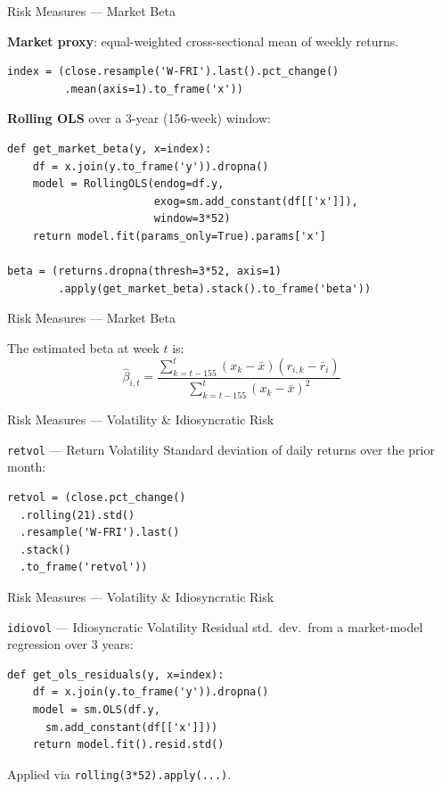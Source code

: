 \documentclass[aspectratio=169]{beamer}
\begin{document}
%
%
\begin{frame}[fragile]{Risk Measures --- Market Beta}

\textbf{Market proxy}: equal-weighted cross-sectional mean of weekly returns.

\begin{lstlisting}
index = (close.resample('W-FRI').last().pct_change()
         .mean(axis=1).to_frame('x'))
\end{lstlisting}

\vspace{0.15cm}

\textbf{Rolling OLS} over a 3-year (156-week) window:

\begin{lstlisting}
def get_market_beta(y, x=index):
    df = x.join(y.to_frame('y')).dropna()
    model = RollingOLS(endog=df.y,
                       exog=sm.add_constant(df[['x']]),
                       window=3*52)
    return model.fit(params_only=True).params['x']

beta = (returns.dropna(thresh=3*52, axis=1)
        .apply(get_market_beta).stack().to_frame('beta'))
\end{lstlisting}
\end{frame}
%
%
\begin{frame}[fragile]{Risk Measures --- Market Beta}

The estimated beta at week $t$ is:
$$
\hat\beta_{i,t} = \frac{\sum_{k=t-155}^{t}(x_k - \bar x)(r_{i,k} - \bar r_i)}{\sum_{k=t-155}^{t}(x_k - \bar x)^2}
$$

\end{frame}
%
%
\begin{frame}[fragile]{Risk Measures --- Volatility \& Idiosyncratic Risk}

\begin{block}{\texttt{retvol} --- Return Volatility}
Standard deviation of daily returns over the prior month:
\begin{lstlisting}
retvol = (close.pct_change()
  .rolling(21).std()
  .resample('W-FRI').last()
  .stack()
  .to_frame('retvol'))
\end{lstlisting}
\end{block}
\end{frame}
%
%
\begin{frame}[fragile]{Risk Measures --- Volatility \& Idiosyncratic Risk}
\begin{block}{\texttt{idiovol} --- Idiosyncratic Volatility}
Residual std.\ dev.\ from a market-model regression over 3 years:
\begin{lstlisting}
def get_ols_residuals(y, x=index):
    df = x.join(y.to_frame('y')).dropna()
    model = sm.OLS(df.y,
      sm.add_constant(df[['x']]))
    return model.fit().resid.std()
\end{lstlisting}
Applied via \texttt{rolling(3*52).apply(...)}.
\end{block}
\end{frame}
\end{document}
